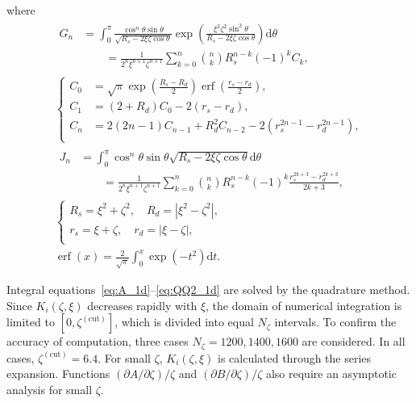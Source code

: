 \documentclass[]{elsarticle} %
\newcommand{\dd}{\mathrm{d}}
\newcommand{\Pder}[2][]{\partial#1/\partial#2}
\DeclareMathOperator{\erf}{erf}
\begin{document}
where
\begin{gather}
    \begin{aligned}
    G_n &= \int_0^\pi \frac{\cos^n\theta \sin\theta}{\sqrt{R_s-2\xi\zeta\cos\theta}}
        \exp\left(\frac{\xi^2\zeta^2\sin^2\theta}{R_s-2\xi\zeta\cos\theta}\right) \dd\theta \\
        &\qquad = \frac1{2^n\xi^{n+1}\zeta^{n+1}} \sum_{k=0}^n {n \choose k} R_s^{n-k} (-1)^k C_k,
    \end{aligned}\\
    \left\{\begin{aligned}
        C_0 &= \sqrt\pi\exp\left(\frac{R_s-R_d}2\right) \erf\left(\frac{r_s-r_d}2\right), \\
        C_1 &= (2+R_d)C_0 - 2(r_s-r_d), \\
        C_n &= 2(2n-1)C_{n-1} + R_d^2C_{n-2} - 2\left(r_s^{2n-1}-r_d^{2n-1}\right), \\
    \end{aligned}\right.\\
    \begin{aligned}
    J_n &= \int_0^\pi \cos^n\theta \sin\theta \sqrt{R_s-2\xi\zeta\cos\theta} \dd\theta \\
        &\qquad = \frac1{2^n\xi^{n+1}\zeta^{n+1}} \sum_{k=0}^n {n \choose k} R_s^{n-k} (-1)^k
        \frac{r_s^{2k+3} - r_d^{2k+3}}{2k+3},
    \end{aligned}\\
    \left\{\begin{gathered}
        R_s = \xi^2 + \zeta^2, \quad R_d = \left|\xi^2 - \zeta^2\right|, \\
        r_s = \xi + \zeta, \quad r_d = \left|\xi - \zeta\right|, \\
    \end{gathered}\right.\\
    \erf(x) = \frac2{\sqrt\pi} \int_0^x \exp(-t^2)\dd{t}.
\end{gather}

Integral equations~\eqref{eq:A_1d}--\eqref{eq:QQ2_1d} are solved by the quadrature method.
Since \(K_i(\zeta,\xi)\) decreases rapidly with \(\xi\),
the domain of numerical integration is limited to \([0,\zeta^{(\mathrm{cut})}]\),
which is divided into equal \(N_\zeta\) intervals.
To confirm the accuracy of computation, three cases \(N_\zeta = 1200, 1400, 1600\)
are considered. In all cases, \(\zeta^{(\mathrm{cut})} = 6.4\).
For small \(\zeta\), \(K_i(\zeta,\xi)\) is calculated through the series expansion.
Functions \((\Pder[A]{\zeta})/\zeta\) and \((\Pder[B]{\zeta})/\zeta\)
also require an asymptotic analysis for small \(\zeta\).
\end{document}
